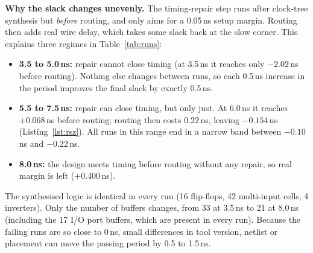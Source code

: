 \documentclass[10pt,a4paper,twocolumn]{article}
\begin{document}
\textbf{Why the slack changes unevenly.} The timing-repair step runs after clock-tree synthesis but \emph{before} routing, and only aims for a 0.05\,ns setup margin. Routing then adds real wire delay, which takes some slack back at the slow corner. This explains three regimes in Table~\ref{tab:runs}:
\begin{itemize}
  \item \textbf{3.5 to 5.0\,ns:} repair cannot close timing (at 3.5\,ns it reaches only $-2.02$\,ns before routing). Nothing else changes between runs, so each 0.5\,ns increase in the period improves the final slack by exactly 0.5\,ns.
  \item \textbf{5.5 to 7.5\,ns:} repair can close timing, but only just. At 6.0\,ns it reaches +0.068\,ns before routing; routing then costs 0.22\,ns, leaving $-0.154$\,ns (Listing~\ref{lst:rsz}). All runs in this range end in a narrow band between $-0.10$\,ns and $-0.22$\,ns.
  \item \textbf{8.0\,ns:} the design meets timing before routing without any repair, so real margin is left (+0.400\,ns).
\end{itemize}
The synthesised logic is identical in every run (16 flip-flops, 42 multi-input cells, 4 inverters). Only the number of buffers changes, from 33 at 3.5\,ns to 21 at 8.0\,ns (including the 17 I/O port buffers, which are present in every run). Because the failing runs are so close to 0\,ns, small differences in tool version, netlist or placement can move the passing period by 0.5 to 1.5\,ns.
\end{document}
